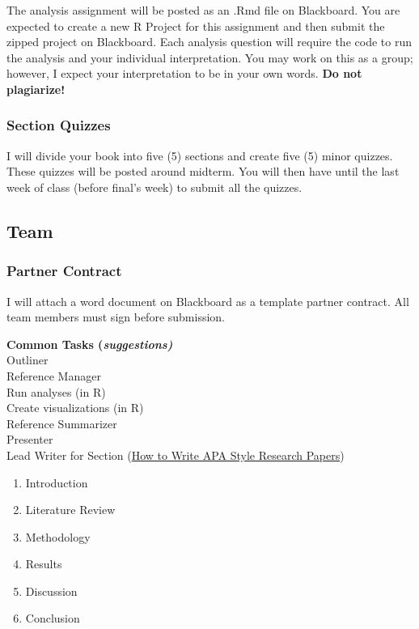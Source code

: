 \documentclass[
  b5paper]{book}
\begin{document}
The analysis assignment will be posted as an .Rmd file on Blackboard. You are expected to create a new R Project for this assignment and then submit the zipped project on Blackboard. Each analysis question will require the code to run the analysis and your individual interpretation. You may work on this as a group; however, I expect your interpretation to be in your own words. \textbf{Do not plagiarize!}

\hypertarget{section-quizzes}{%
\subsubsection*{Section Quizzes}\label{section-quizzes}}

I will divide your book into five (5) sections and create five (5) minor quizzes. These quizzes will be posted around midterm. You will then have until the last week of class (before final's week) to submit all the quizzes.

\hypertarget{team}{%
\subsection*{Team}\label{team}}

\hypertarget{partner-contract}{%
\subsubsection*{Partner Contract}\label{partner-contract}}

I will attach a word document on Blackboard as a template partner contract. All team members must sign before submission.

\textbf{Common Tasks (\emph{suggestions)}\\
}Outliner\\
Reference Manager\\
Run analyses (in R)\\
Create visualizations (in R)\\
Reference Summarizer\\
Presenter\\
Lead Writer for Section (\href{https://psychology.ucsd.edu/_files/undergrad/writingresearchpapersinapastyleguide.pdf}{How to Write APA Style Research Papers})

\begin{enumerate}
\def\labelenumi{\arabic{enumi}.}
\item
  Introduction
\item
  Literature Review
\item
  Methodology
\item
  Results
\item
  Discussion
\item
  Conclusion
\end{enumerate}
\end{document}

